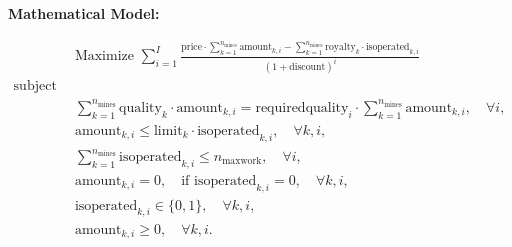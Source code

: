 \documentclass{article}
\begin{document}
\textbf{Mathematical Model:}

\begin{align*}
& \text{Maximize } \sum_{i=1}^{I} \frac{\text{price} \cdot \sum_{k=1}^{n_{\text{mines}}} \text{amount}_{k,i} - \sum_{k=1}^{n_{\text{mines}}} \text{royalty}_k \cdot \text{isoperated}_{k,i}}{(1 + \text{discount})^i} \\
\text{subject to:} \\
& \sum_{k=1}^{n_{\text{mines}}} \text{quality}_k \cdot \text{amount}_{k,i} = \text{requiredquality}_i \cdot \sum_{k=1}^{n_{\text{mines}}} \text{amount}_{k,i}, \quad \forall i, \\
& \text{amount}_{k,i} \leq \text{limit}_k \cdot \text{isoperated}_{k,i}, \quad \forall k, i, \\
& \sum_{k=1}^{n_{\text{mines}}} \text{isoperated}_{k,i} \leq n_{\text{maxwork}}, \quad \forall i, \\
& \text{amount}_{k,i} = 0, \quad \text{if } \text{isoperated}_{k,i} = 0, \quad \forall k, i, \\
& \text{isoperated}_{k,i} \in \{0, 1\}, \quad \forall k, i, \\
& \text{amount}_{k,i} \geq 0, \quad \forall k, i.
\end{align*}
\end{document}
